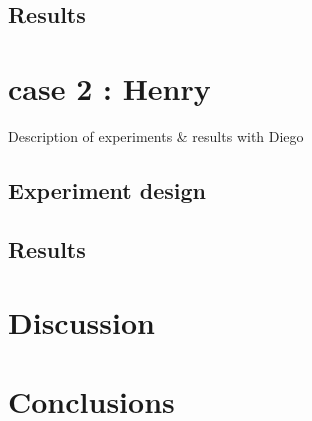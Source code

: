 \documentclass{sig-alternate}
\begin{document}
\subsection{Results}

\section{case 2 : Henry}
Description of experiments \& results with Diego

\subsection{Experiment design}

\subsection{Results}

\section{Discussion}

\section{Conclusions}


 
\end{document}
